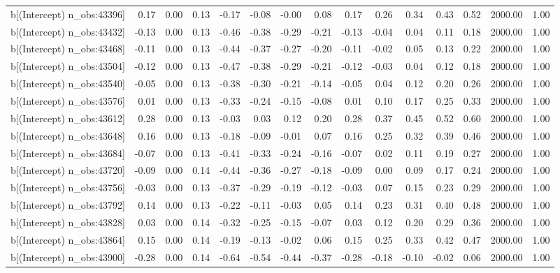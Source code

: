 \begin{table}[ht]
\begin{tabular}{rrrrrrrrrrrrrrr}
  b[(Intercept) n\_obs:43396] & 0.17 & 0.00 & 0.13 & -0.17 & -0.08 & -0.00 & 0.08 & 0.17 & 0.26 & 0.34 & 0.43 & 0.52 & 2000.00 & 1.00 \\ 
  b[(Intercept) n\_obs:43432] & -0.13 & 0.00 & 0.13 & -0.46 & -0.38 & -0.29 & -0.21 & -0.13 & -0.04 & 0.04 & 0.11 & 0.18 & 2000.00 & 1.00 \\ 
  b[(Intercept) n\_obs:43468] & -0.11 & 0.00 & 0.13 & -0.44 & -0.37 & -0.27 & -0.20 & -0.11 & -0.02 & 0.05 & 0.13 & 0.22 & 2000.00 & 1.00 \\ 
  b[(Intercept) n\_obs:43504] & -0.12 & 0.00 & 0.13 & -0.47 & -0.38 & -0.29 & -0.21 & -0.12 & -0.03 & 0.04 & 0.12 & 0.18 & 2000.00 & 1.00 \\ 
  b[(Intercept) n\_obs:43540] & -0.05 & 0.00 & 0.13 & -0.38 & -0.30 & -0.21 & -0.14 & -0.05 & 0.04 & 0.12 & 0.20 & 0.26 & 2000.00 & 1.00 \\ 
  b[(Intercept) n\_obs:43576] & 0.01 & 0.00 & 0.13 & -0.33 & -0.24 & -0.15 & -0.08 & 0.01 & 0.10 & 0.17 & 0.25 & 0.33 & 2000.00 & 1.00 \\ 
  b[(Intercept) n\_obs:43612] & 0.28 & 0.00 & 0.13 & -0.03 & 0.03 & 0.12 & 0.20 & 0.28 & 0.37 & 0.45 & 0.52 & 0.60 & 2000.00 & 1.00 \\ 
  b[(Intercept) n\_obs:43648] & 0.16 & 0.00 & 0.13 & -0.18 & -0.09 & -0.01 & 0.07 & 0.16 & 0.25 & 0.32 & 0.39 & 0.46 & 2000.00 & 1.00 \\ 
  b[(Intercept) n\_obs:43684] & -0.07 & 0.00 & 0.13 & -0.41 & -0.33 & -0.24 & -0.16 & -0.07 & 0.02 & 0.11 & 0.19 & 0.27 & 2000.00 & 1.00 \\ 
  b[(Intercept) n\_obs:43720] & -0.09 & 0.00 & 0.14 & -0.44 & -0.36 & -0.27 & -0.18 & -0.09 & 0.00 & 0.09 & 0.17 & 0.24 & 2000.00 & 1.00 \\ 
  b[(Intercept) n\_obs:43756] & -0.03 & 0.00 & 0.13 & -0.37 & -0.29 & -0.19 & -0.12 & -0.03 & 0.07 & 0.15 & 0.23 & 0.29 & 2000.00 & 1.00 \\ 
  b[(Intercept) n\_obs:43792] & 0.14 & 0.00 & 0.13 & -0.22 & -0.11 & -0.03 & 0.05 & 0.14 & 0.23 & 0.31 & 0.40 & 0.48 & 2000.00 & 1.00 \\ 
  b[(Intercept) n\_obs:43828] & 0.03 & 0.00 & 0.14 & -0.32 & -0.25 & -0.15 & -0.07 & 0.03 & 0.12 & 0.20 & 0.29 & 0.36 & 2000.00 & 1.00 \\ 
  b[(Intercept) n\_obs:43864] & 0.15 & 0.00 & 0.14 & -0.19 & -0.13 & -0.02 & 0.06 & 0.15 & 0.25 & 0.33 & 0.42 & 0.47 & 2000.00 & 1.00 \\ 
  b[(Intercept) n\_obs:43900] & -0.28 & 0.00 & 0.14 & -0.64 & -0.54 & -0.44 & -0.37 & -0.28 & -0.18 & -0.10 & -0.02 & 0.06 & 2000.00 & 1.00 \\ 

\end{tabular}
\end{table}
